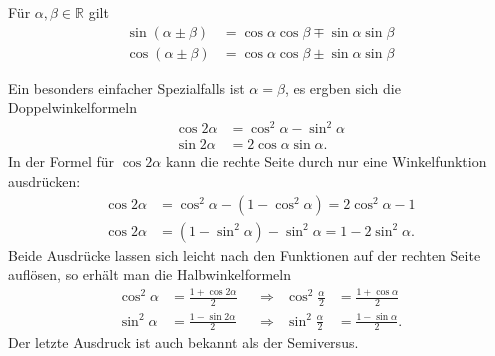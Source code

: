 \begin{satz}
Für $\alpha,\beta\in\mathbb{R}$ gilt
\begin{align*}
\sin(\alpha\pm\beta)
&=
\cos\alpha\cos\beta\mp\sin\alpha\sin\beta
\\
\cos(\alpha\pm\beta)
&=
\cos\alpha\cos\beta\pm\sin\alpha\sin\beta
\end{align*}
\end{satz}

Ein besonders einfacher Spezialfalls ist $\alpha=\beta$, es ergben sich die
Doppelwinkelformeln
\begin{align*}
\cos2\alpha &= \cos^2\alpha-\sin^2\alpha
\\
\sin2\alpha &= 2\cos\alpha\sin\alpha.
\end{align*}
In der Formel für $\cos2\alpha$ kann die rechte Seite durch nur
eine Winkelfunktion ausdrücken:
\begin{align*}
\cos2\alpha &= \cos^2\alpha - (1-\cos^2\alpha) = 2\cos^2\alpha -1
\\
\cos2\alpha &= (1-\sin^2\alpha) - \sin^2\alpha = 1-2\sin^2\alpha.
\end{align*}
Beide Ausdrücke lassen sich leicht nach den Funktionen auf der rechten
Seite auflösen, so erhält man die Halbwinkelformeln
\begin{align*}
\cos^2\alpha &= \frac{1+\cos2\alpha}2
&&\Rightarrow&
\cos^2\frac{\alpha}2 &=\frac{1+\cos\alpha}2
\\
\sin^2\alpha &= \frac{1-\sin2\alpha}2
&&\Rightarrow&
\sin^2\frac{\alpha}2 &= \frac{1-\sin\alpha}2.
\end{align*}
Der letzte Ausdruck ist auch bekannt als der Semiversus.

